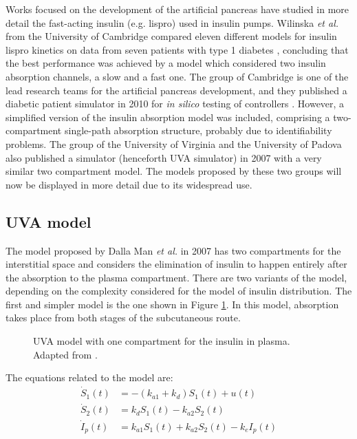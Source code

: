 Works focused on the development of the artificial pancreas have studied in more detail the fast-acting insulin (e.g. lispro) used in insulin pumps. Wilinska \textit{et al.} from the University of Cambridge compared eleven different models for insulin lispro kinetics on data from seven patients with type 1 diabetes \cite{wilinska2005insulin}, concluding that the best performance was achieved by a model which considered two insulin absorption channels, a slow and a fast one. The group of Cambridge is one of the lead research teams for the artificial pancreas development, and they published a diabetic patient simulator in 2010 for \emph{in silico} testing of controllers \cite{simuladorhovorka}. However, a simplified version of the insulin absorption model was included, comprising a two-compartment single-path absorption structure, probably due to identifiability problems. The group of the University of Virginia and the University of Padova also published a simulator (henceforth UVA simulator) in 2007 \cite{magni2007model} with a very similar two compartment model. The models proposed by these two groups will now be displayed in more detail due to its widespread use.

\subsection{UVA model}
\label{sec:UVAins}

The model proposed by Dalla Man \textit{et al.} in 2007 \cite{man2007meal} has two compartments for the interstitial space and considers the elimination of insulin to happen entirely after the absorption to the plasma compartment. There are two variants of the model, depending on the complexity considered for the model of insulin distribution. The first and simpler model is the one shown in Figure \ref{fig:cobellisc1}. In this model, absorption takes place from both stages of the subcutaneous route.

\begin{figure}[hbtp]
\centering
{}\caption{UVA model with one compartment for the insulin in plasma. Adapted from \cite{man2007meal}.}
\label{fig:cobellisc1}
\end{figure}

The equations related to the model are:
\begin{align}
	\dot{S}_{1}(t) &= -(k_{a1}+k_{d})S_{1}(t)+u(t) \label{eq:cobellisc1}\\
	\dot{S}_{2}(t) &= k_{d}S_{1}(t)-k_{a2}S_{2}(t) \label{eq:cobellisc2}\\
	\dot{I}_{p}(t) &= k_{a1}S_{1}(t)+k_{a2}S_{2}(t)-k_{e}I_{p}(t) \label{eq:cobellisc3}
\end{align}

